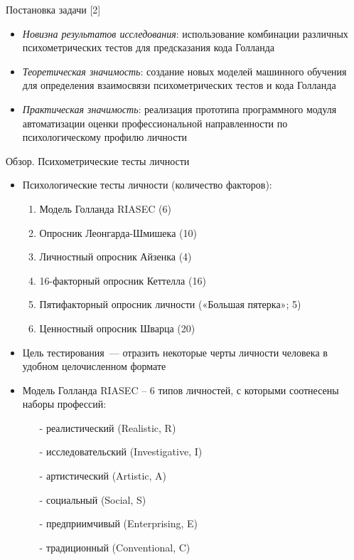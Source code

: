 \documentclass[english,russian, 10pt]{beamer}
\begin{document}
\begin{frame}{Постановка задачи [2]}
    \begin{itemize}
        \item \emph{Новизна результатов исследования}: использование комбинации различных психометрических тестов для предсказания кода Голланда
        \item \emph{Теоретическая значимость}: создание новых моделей машинного обучения для определения взаимосвязи психометрических тестов и кода Голланда
        \item \emph{Практическая значимость}: реализация прототипа программного модуля автоматизации оценки профессиональной направленности по психологическому профилю личности
    \end{itemize}
\end{frame}


\begin{frame}{Обзор. Психометрические  тесты личности}
    \begin{itemize}
    \item Психологические тесты личности (количество факторов):
        \begin{enumerate}
            \item Модель Голланда RIASEC (6)
            \item Опросник Леонгарда-Шмишека (10)
            \item Личностный опросник Айзенка (4)
            \item 16-факторный опросник Кеттелла (16)
            \item Пятифакторный опросник личности («Большая пятерка»; 5)
            \item Ценностный опросник Шварца (20)
        \end{enumerate}
    \item Цель тестирования~--- отразить некоторые черты личности человека в удобном целочисленном формате
    \item Модель Голланда RIASEC – 6 типов личностей, с которыми соотнесены наборы профессий:
        \begin{itemize}
            \item[-] реалистический (Realistic, R)
            \item[-] исследовательский (Investigative, I)
            \item[-] артистический (Artistic, A)
            \item[-] социальный (Social, S)
            \item[-] предприимчивый (Enterprising, E)
            \item[-] традиционный (Conventional, C)
        \end{itemize}
    \end{itemize}
\end{frame}
\end{document}
